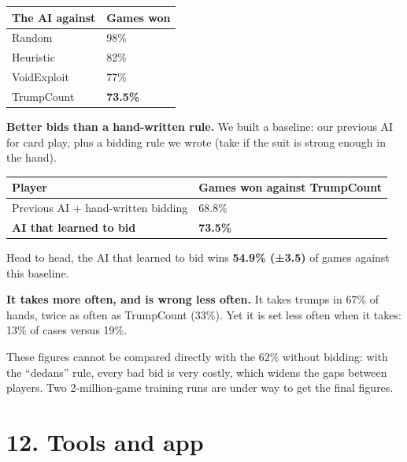 \begin{table}[htbp]\centering\small\begin{tabular}{ll}\toprule

The AI against & Games won \\\midrule

Random & 98\% \\

Heuristic & 82\% \\

VoidExploit & 77\% \\

TrumpCount & \textbf{73.5\%} \\

\bottomrule\end{tabular}\end{table}

\textbf{Better bids than a hand-written rule.} We built a baseline: our previous AI for card play, plus a bidding rule we wrote (take if the suit is strong enough in the hand).

\begin{table}[htbp]\centering\small\begin{tabularx}{\linewidth}{Xl}\toprule

Player & Games won against TrumpCount \\\midrule

Previous AI + hand-written bidding & 68.8\% \\

\textbf{AI that learned to bid} & \textbf{73.5\%} \\

\bottomrule\end{tabularx}\end{table}

Head to head, the AI that learned to bid wins \textbf{54.9\% (±3.5)} of games against this baseline.

\textbf{It takes more often, and is wrong less often.} It takes trumps in 67\% of hands, twice as often as TrumpCount (33\%). Yet it is set less often when it takes: 13\% of cases versus 19\%.

These figures cannot be compared directly with the 62\% without bidding: with the ``dedans'' rule, every bad bid is very costly, which widens the gaps between players. Two 2-million-game training runs are under way to get the final figures.

\section*{12. Tools and app}

